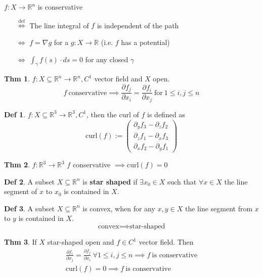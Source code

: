\documentclass[a4paper, 10pt]{article}
\theoremstyle{definition}
\newtheorem*{theorem}{Thm}
\newtheorem*{definition}{Def}
\newcommand{\R}{\mathbb{R}}
\begin{document}
\begin{ntheorem*}
    \(f: X \to \R^n\) is conservative
    \begin{enumerate}
        \item[\(\stackrel{\text{def}}{\iff}\)] The line integral of \(f\) is independent of the path
        \item[\(\iff\)] \(f = \nabla g\) for a \(g: X \to \R\) (i.e. \(f\) has a potential)
        \item[\(\iff\)] \(\int_\gamma f(s) \cdot ds = 0\) for any closed \(\gamma\)
    \end{enumerate}
\end{ntheorem*}

\begin{theorem}
    \(f: X \subseteq \R^n \to \R^n, C^1\) vector field and \(X\) open.
    \[f \ \text{conservative} \implies \frac{\partial f_j}{\partial x_i} = \frac{\partial f_i}{\partial x_j} \ \text{for} \ 1 \leq i, j \leq n\]
\end{theorem}

\begin{definition}
    \(f: X \subseteq \R^3 \to \R^3, C^1\), then the curl of \(f\) is defined as
    \[\text{curl}(f) := \begin{pmatrix}
        \partial_y f_3 - \partial_z f_2 \\
        \partial_z f_1 - \partial_x f_3 \\
        \partial_x f_2 - \partial_y f_1
    \end{pmatrix}\]
\end{definition}

\begin{theorem}
    \(f: \R^3 \to \R^3\) \(f\) conservative \(\implies \text{curl}(f) = 0\)
\end{theorem}

\begin{definition}
    A subset \(X \subseteq \R^n\) is \textbf{star shaped} if \(\exists x_0 \in X\) such that \(\forall x \in X\) the line segment of \(x\) to \(x_0\) is contained in \(X\).
\end{definition}

\begin{definition}
    A subset \(X \subseteq \R^n\) is convex, when for any \(x, y \in X\) the line segment from \(x\) to \(y\) is contained in \(X\).
    \[\text{convex} \implies \text{star-shaped}\]
\end{definition}

\begin{theorem}
    If \(X\) star-shaped open and \(f \in C^1\) vector field. Then
    \begin{gather*}
        \frac{\partial f_i}{\partial x_j} = \frac{\partial f_j}{\partial x_i} \ \forall 1 \leq i, j \leq n \implies f \ \text{is conservative} \\
        \text{curl}(f) = 0 \implies f \ \text{is conservative}
    \end{gather*}
\end{theorem}
\end{document}
